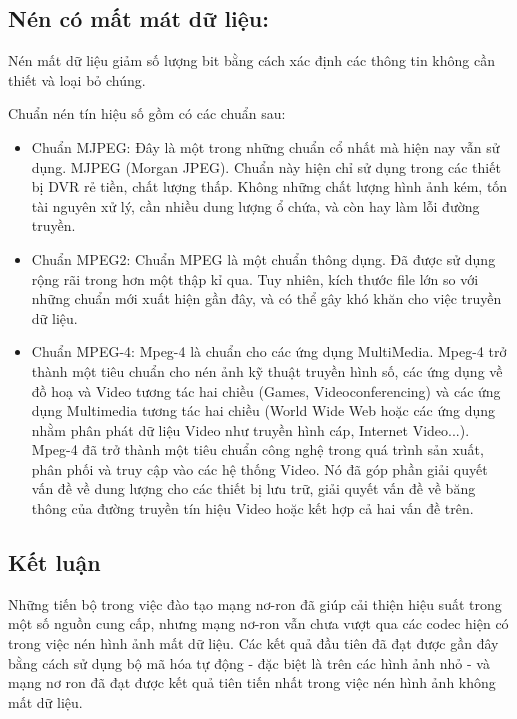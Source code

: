 \subsection{Nén có mất mát dữ liệu:}

Nén mất dữ liệu giảm số lượng bit bằng cách xác định các thông tin không cần thiết
và loại bỏ chúng.

Chuẩn nén tín hiệu số gồm có các chuẩn sau:

\begin{itemize}[leftmargin=1.5cm]
      \item Chuẩn MJPEG:
            Đây là một trong những chuẩn cổ nhất mà hiện nay vẫn sử dụng. MJPEG (Morgan JPEG). Chuẩn này hiện chỉ sử dụng trong các thiết bị DVR rẻ tiền, chất lượng thấp. Không những chất lượng hình ảnh kém, tốn tài nguyên xử lý, cần nhiều dung lượng ổ chứa, và còn hay làm lỗi đường truyền.
      \item Chuẩn MPEG2:
            Chuẩn MPEG là một chuẩn thông dụng. Đã được sử dụng rộng rãi trong hơn một thập kỉ qua. Tuy nhiên, kích thước file lớn so với những chuẩn mới xuất hiện gần đây, và có thể gây khó khăn cho việc truyền dữ liệu.
      \item Chuẩn MPEG-4:
            Mpeg-4 là chuẩn cho các ứng dụng MultiMedia. Mpeg-4 trở thành một tiêu chuẩn cho nén ảnh kỹ thuật truyền hình số, các ứng dụng về đồ hoạ và Video tương tác hai chiều (Games, Videoconferencing) và các ứng dụng Multimedia tương tác hai chiều (World Wide Web hoặc các ứng dụng nhằm phân phát dữ liệu Video như truyền hình cáp, Internet Video...). Mpeg-4 đã trở thành một tiêu chuẩn công nghệ trong quá trình sản xuất, phân phối và truy cập vào các hệ thống Video. Nó đã góp phần giải quyết vấn đề về dung lượng cho các thiết bị lưu trữ, giải quyết vấn đề về băng thông của đường truyền tín hiệu Video hoặc kết hợp cả hai vấn đề trên.


\end{itemize}

\subsection{Kết luận}

Những tiến bộ trong việc đào tạo mạng nơ-ron đã giúp cải thiện hiệu suất
trong một số nguồn cung cấp, nhưng mạng nơ-ron vẫn chưa vượt qua các codec
hiện có trong việc nén hình ảnh mất dữ liệu. Các kết quả đầu tiên đã đạt
được gần đây bằng cách sử dụng bộ mã hóa tự động - đặc biệt là trên các hình ảnh nhỏ
- và mạng nơ ron đã đạt được kết quả tiên tiến nhất trong việc nén hình ảnh
không mất dữ liệu.

